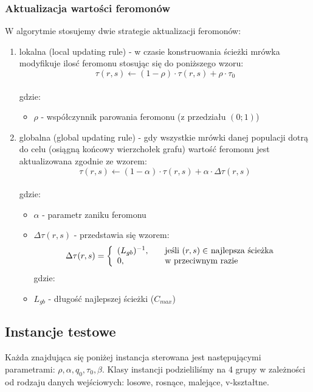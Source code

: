 \documentclass[10pt,a4paper]{article}
\begin{document}
\subsubsection{Aktualizacja wartości feromonów}
W algorytmie stosujemy dwie strategie aktualizacji feromonów: \\
\begin{enumerate}
  \item lokalna (local updating rule) - w czasie konstruowania ścieżki mrówka
    modyfikuje ilosć feromonu stosując się do poniższego wzoru:\\
  \[ \tau (r,s) \leftarrow (1 - \rho) \cdot \tau (r,s) + \rho \cdot \tau_0  \] \\
  gdzie:
  \begin{itemize}
  \item $ \rho $ - współczynnik parowania feromonu (z przedziału $ (0;1) $)
\end{itemize}

  \item globalna (global updating rule) - gdy wszystkie mrówki danej populacji
    dotrą do celu (osiągną końcowy wierzchołek grafu) wartość feromonu jest
    aktualizowana zgodnie ze wzorem:\\
   \[ \tau (r,s) \leftarrow (1 - \alpha) \cdot \tau (r,s) + \alpha \cdot \Delta \tau (r,s)  \] \\
  gdzie:
  \begin{itemize}
  \item $ \alpha $ - parametr zaniku feromonu
  \item $ \Delta \tau (r,s) $ - przedstawia się wzorem: \\
  \begin{equation}
 \Delta \tau (r,s) = \left\{ 
  \begin{array}{l l}
    (L_{gb})^{-1} , & \quad \text{jeśli $(r,s) \in$ najlepsza ścieżka}\\
    0, & \quad \text{w przeciwnym razie}
  \end{array} \right.
\end{equation}
  gdzie:
  \item $ L_{gb}$ - długość najlepszej ścieżki ($C_{max}$)
\end{itemize}
\end{enumerate}

\subsection{Instancje testowe}
Każda znajdująca się poniżej instancja sterowana jest następującymi
parametrami: $ \rho, \alpha, q_0, \tau_0, \beta $.  Klasy instancji
podzieliliśmy na 4 grupy w zależności od rodzaju danych wejściowych: losowe,
rosnące, malejące, v-kształtne.
\end{document}
